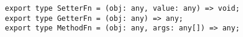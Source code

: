\begin{verbatim}
export type SetterFn = (obj: any, value: any) => void;
export type GetterFn = (obj: any) => any;
export type MethodFn = (obj: any, args: any[]) => any;
\end{verbatim}
